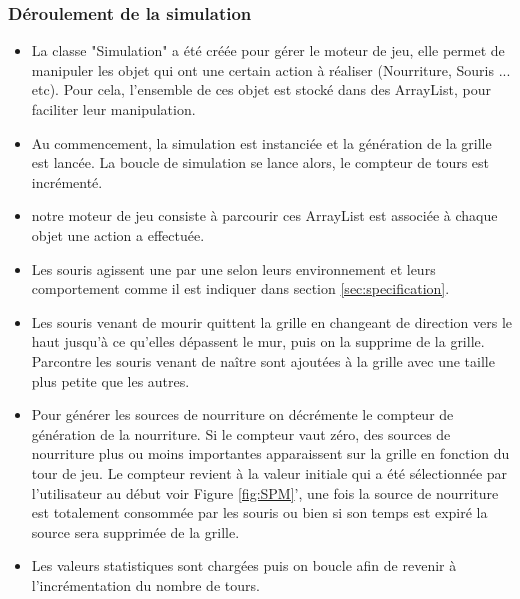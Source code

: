 \subsubsection{Déroulement de la simulation}
\begin{itemize}
\item La classe "Simulation" a été créée pour gérer le moteur de jeu, elle permet de manipuler les objet qui ont une certain action à réaliser (Nourriture, Souris ... etc). Pour cela, l'ensemble de ces objet est stocké dans des ArrayList, pour faciliter leur manipulation.
\item Au commencement, la simulation est instanciée et la génération de la grille est lancée. La boucle de simulation se lance alors, le compteur de tours est incrémenté.
\item notre moteur de jeu consiste à parcourir ces ArrayList est associée à chaque objet une action a effectuée.
\item Les souris agissent une par une selon leurs environnement et leurs comportement comme il est indiquer dans section \ref{sec:specification}.
\item Les souris venant de mourir quittent la grille en changeant de direction vers le haut jusqu’à ce qu'elles dépassent le mur, puis on la supprime de la grille. Parcontre les souris venant de naître sont ajoutées à la grille avec une taille plus petite que les autres. 
\item Pour générer les sources de nourriture on décrémente le compteur de génération de la nourriture. Si le compteur vaut zéro, des sources de nourriture plus ou moins importantes apparaissent sur la grille en fonction du tour de jeu. Le compteur revient à la valeur initiale qui a été sélectionnée par l'utilisateur au début voir Figure \ref{fig:SPM}', une fois la source de nourriture est totalement consommée par les souris ou bien si son temps est expiré la source sera supprimée de la grille.
\item Les valeurs statistiques sont chargées puis on boucle afin de revenir à l'incrémentation du nombre de tours. 

\end{itemize}

